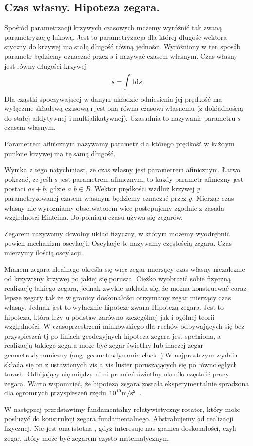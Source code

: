 \subsection{Czas własny. Hipoteza zegara.}
Spośród parametrzacji krzywych czasowych
 możemy wyróżnić tak zwaną parametryzację łukową.
Jest to parametryzacja dla której długość 
wektora styczny do krzywej ma stałą długość równą jedności.
Wyróżniony w ten sposób parametr będziemy oznaczać przez 
$s$ i nazywać czasem własnym.
Czas własny jest równy długości krzywej
\begin{align*}
s = \int 1 \text{d} s
\end{align*}
Dla cząstki spoczywającej w danym układzie odniesienia jej prędkość
ma wyłącznie składową czasową i jest 
ona równa czasowi własnemu (z dokładnością
do stałej addytywnej i multiplikatywnej). 
Uzasadnia to nazywanie parametru $s$ czasem własnym.
\begin{definition}
Parametrem afinicznym nazywamy parametr dla którego 
prędkość w każdym punkcie krzywej ma tę samą długość.
\end{definition}
Wynika z tego natychmiast, że czas własny jest parametrem afinicznym.
Łatwo pokazać, że jeśli $s$ jest 
parametrem afinicznym, to każdy parametr afiniczny 
jest postaci $a s+b$, gdzie $a,b\in R$.
Wektor prędkości wzdłuż krzywej $y$ parametryzowanej czasem 
własnym będziemy oznaczać przez $\dot{y}$.
Mierząc czas własny nie wyrozniamy obserwatorem wiec 
postepujemy zgodnie z zasada wzglednosci Einteina. 
Do pomiaru czasu używa się zegarów.
\begin{definition}
Zegarem nazywamy dowolny układ fizyczny, w którym możemy wyodrębnić pewien
mechanizm oscylacji. Oscylacje te nazywamy częstością zegara. Czas mierzymy
ilością oscylacji.
\end{definition}
Mianem zegara idealnego określa się więc zegar mierzący czas własny
niezależnie od krzywizny krzywej po jakiej się porusza.
Ciężko wyobrazić sobie fizyczną realizację takiego zegara, jednak
zwykle zakłada się, że można konstruować coraz lepsze zegary 
tak że w granicy doskonałości otrzymamy zegar mierzący czas własny. 
Jednak jest to wyłacznie hipoteze zwana Hipotezą zegara.
Jest to hipoteza, która leży u podstaw zarówno 
szczególnej jak i ogólnej teorii względności. 
W czasoprzestrzeni minkowskiego dla 
ruchów odbywających się bez przyspieszeń 
tj po liniach geodezyjnych
hipoteza zegara jest spełniona, a 
realizacją takiego zegara może być zegar świetlny lub inaczej
zegar geometrodynamiczny (ang. geometrodynamic 
clock~\cite{ohanian2013gravitation})
W najprostrzym wydaiu składa się on z ustawionych 
vis a vis luster poruszających się po równoległych torach.
Odbijający się między nimi promień świetlny 
określa częstość pracy zegara. 
Warto wspomnieć, że hipoteza zegara 
została eksperymentalnie spradzona dla ogromnych 
przyspieszeń rzędu~$10^{19}\si{\metre\per\second^2}$~\cite{Bailey1977}.

W następnej przedstawimy fundamentalny 
relatywistyczny rotator, który może posłużyć do konstrukcji zegara 
fundamentalnego. Abstrahujemy od realizacji fizycznej. 
Nie jest ona istotna , gdyż interesuje nas granica doskonałości, 
czyli zegar, który może być
zegarem czysto matematycznym.  





